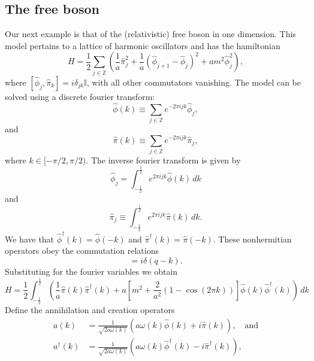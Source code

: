 \documentclass[prl,twocolumn,lengthcheck,superscriptaddress]{revtex4-1}
\theoremstyle{definition}
\theoremstyle{remark}
\begin{document}
\subsection{The free boson}
Our next example is that of the (relativistic) free boson in one dimension. This model pertains to a lattice of harmonic oscillators and has the hamiltonian
\begin{equation}
	H = \frac12\sum_{j\in \mathbb{Z}} \left(\frac{1}{a}\widehat{\pi}_j^2 + \frac{1}{a}(\widehat{\phi}_{j+1}-\widehat{\phi}_{j})^2 + am^2\widehat{\phi}_{j}^2  \right),
\end{equation}
where $[\widehat{\phi}_j, \widehat{\pi}_k] = i\delta_{jk}\mathbb{I}$, with all other commutators vanishing. The model can be solved using a discrete fourier transform:
\begin{equation}
	\widehat{\phi}(k) \equiv \sum_{j\in \mathbb{Z}} e^{-2\pi ijk}\widehat{\phi}_j,
\end{equation}
and
\begin{equation}
	\widehat{\pi}(k) \equiv \sum_{j\in\mathbb{Z}} e^{-2\pi ijk}\widehat{\pi}_j,
\end{equation}
where $k \in [-\pi/2, \pi/2)$. The inverse fourier transform is given by
\begin{equation}
	\widehat{\phi}_j = \int_{-\frac{1}{2}}^{\frac{1}{2}}  e^{2\pi ijk}\widehat{\phi}(k)\, dk
\end{equation}
and
\begin{equation}
	\widehat{\pi}_j \equiv \int_{-\frac{1}{2}}^{\frac{1}{2}}  e^{2\pi ijk}\widehat{\pi}(k)\, dk.
\end{equation}
We have that $\widehat{\phi}^\dag(k) = \widehat{\phi}(-k)$ and $\widehat{\pi}^\dag(k) = \widehat{\pi} (-k)$. These nonhermitian operators obey the commutation relations
\begin{equation}
	[\widehat{\phi}(k), \widehat{\pi}^\dag(q)] = i\delta(q-k).
\end{equation} 
Substituting for the fourier variables we obtain
\begin{equation}
	H = \frac12  \int_{-\frac{1}{2}}^{\frac{1}{2}}  \left(\frac{1}{a}\widehat{\pi} (k)\widehat{\pi}^\dag(k)+ a\left[m^2 + \frac{2}{a^2}\left(1-\cos\left(2\pi k\right)\right)\right] \widehat{\phi}(k)\widehat{\phi}^\dag(k)\right)\,dk
\end{equation}
Define the annihilation and creation operators
\begin{equation}
	\begin{split}
		a(k) &= \frac{1}{\sqrt{2a\omega(k)}}(a\omega(k)\widehat{\phi}(k) + i\widehat{\pi}(k)), \quad \text{and} \\ 
		a^\dag(k) &= \frac{1}{\sqrt{2a\omega(k)}}(a\omega(k)\widehat{\phi}^\dag(k) - i\widehat{\pi}^\dag(k)),
	\end{split}
\end{equation}
\end{document}
